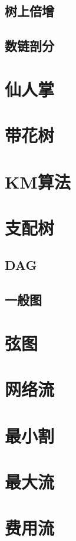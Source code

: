 \subsection{树上倍增}
\subsection{数链剖分}
\section{仙人掌}
\section{带花树}
\section{KM算法}
\section{支配树}
\subsection{DAG}
\subsection{一般图}
\section{弦图}
\section{网络流}
\section{最小割}
\section{最大流}
\section{费用流}
